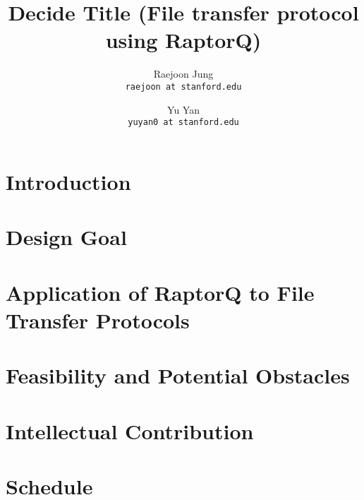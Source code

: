 \documentclass{sig-alternate-10pt}
\begin{document}
\title{Decide Title (File transfer protocol using RaptorQ)}
\author{
  Raejoon Jung\\
  \texttt{raejoon at stanford.edu}
  \and 
  Yu Yan\\
  \texttt{yuyan0 at stanford.edu}
}

\maketitle
\section{Introduction}

\section{Design Goal}

\section{Application of RaptorQ to File Transfer Protocols}

\section{Feasibility and Potential Obstacles}

\section{Intellectual Contribution}

\section{Schedule}
\end{document}
